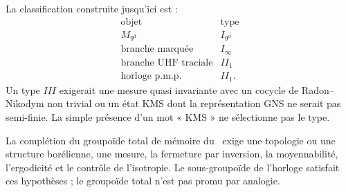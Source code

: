 La classification construite jusqu'ici est :
\[
\begin{array}{c|c}
\text{objet}&\text{type}\\
\hline
M_{9^d}&I_{9^d}\\
\text{branche marquée}&I_\infty\\
\text{branche UHF traciale}&II_1\\
\text{horloge p.m.p.}&II_1.
\end{array}
\]
Un type \(III\) exigerait une mesure quasi invariante avec un cocycle de
Radon--Nikodym non trivial ou un état KMS dont la représentation GNS ne serait pas
semi-finie. La simple présence d'un mot « KMS » ne sélectionne pas le type.


\begin{workbox}
La complétion du groupoïde total de mémoire du \TPK\ exige une topologie
ou une structure borélienne, une mesure, la fermeture par inversion, la moyennabilité,
l'ergodicité et le contrôle de l'isotropie. Le sous-groupoïde de l'horloge satisfait ces
hypothèses ; le groupoïde total n'est pas promu par analogie.
\end{workbox}
